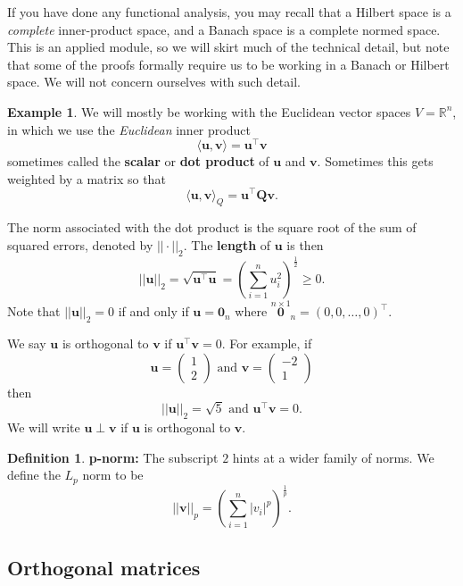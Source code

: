 \documentclass[
]{book}
\theoremstyle{definition}
\newtheorem{definition}{Definition}[chapter]
\theoremstyle{definition}
\newtheorem{example}{Example}[chapter]
\theoremstyle{definition}
\theoremstyle{definition}
\theoremstyle{remark}
\begin{document}
If you have done any functional analysis, you may recall that a Hilbert space is a \emph{complete} inner-product space, and a Banach space is a complete normed space. This is an applied module, so we will skirt much of the technical detail, but note that some of the proofs formally require us to be working in a Banach or Hilbert space. We will not concern ourselves with such detail.

\begin{example}
\protect\hypertarget{exm:Rp3}{}\label{exm:Rp3}We will mostly be working with the Euclidean vector spaces \(V=\mathbb{R}^n\), in which we use the \emph{Euclidean} inner product
\[\langle \mathbf u, \mathbf v\rangle = \mathbf u^\top \mathbf v\]
sometimes called the \textbf{scalar} or \textbf{dot product} of \(\mathbf u\) and \(\mathbf v\). Sometimes this gets weighted by a matrix so that
\[\langle \mathbf u, \mathbf v\rangle_Q = \mathbf u^\top \mathbf Q\mathbf v.\]

The norm associated with the dot product is the square root of the sum of squared errors, denoted by \(|| \cdot ||_2\).
The \textbf{length} of \(\mathbf u\) is then
\[||\mathbf u||_2=\sqrt{\mathbf u^\top \mathbf u} =\left( \sum_{i=1}^n u_i^2\right)^\frac{1}{2}\geq 0.\]
Note that \(||\mathbf u||_2=0\) if and only if \(\mathbf u={\mathbf 0}_n\) where \(\stackrel{n\times 1}{\mathbf 0}_n=(0,0,\dots ,0)^\top\).

We say \(\mathbf u\) is orthogonal to \(\mathbf v\) if \(\mathbf u^\top \mathbf v=0\).
For example, if
\[\mathbf u=\left(\begin{array}{c}1\\2\end{array}\right) \mbox{ and } \mathbf v=\left(\begin{array}{c}-2\\1\end{array}\right)\]
then
\[||\mathbf u||_2 = \sqrt{5}\mbox{ and } \mathbf u^\top \mathbf v=0.\]
We will write \(\mathbf u\perp \mathbf v\) if \(\mathbf u\) is orthogonal to \(\mathbf v\).
\end{example}

\begin{definition}
\protect\hypertarget{def:pnorms}{}\label{def:pnorms}\textbf{p-norm:} The subscript \(2\) hints at a wider family of norms. We define the \(L_p\) norm to be
\[|| \mathbf v||_p = \left(\sum_{i=1}^n |v_i|^p\right)^\frac{1}{p}.\]
\end{definition}

\hypertarget{orthogonal-matrices}{%
\subsection{Orthogonal matrices}\label{orthogonal-matrices}}
\end{document}
